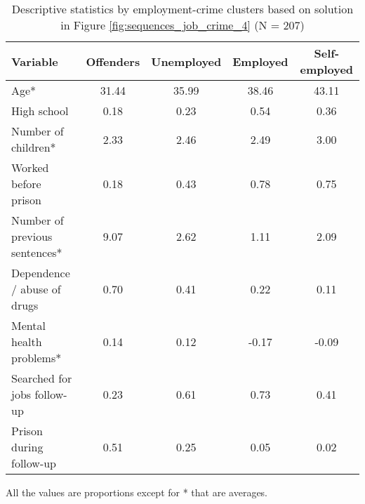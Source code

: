 \begin{table}[htp]
\footnotesize
\setlength{\tabcolsep}{10pt}
\renewcommand{\arraystretch}{1.3}
\begin{threeparttable}
\centering
\caption{Descriptive statistics by employment-crime clusters \newline based on solution in Figure \ref{fig:sequences_job_crime_4} (N = 207)} 
\label{tab:descriptives_job_crime_4}
\begin{tabular}{lcccc}
  \hline
Variable & Offenders & Unemployed & Employed & Self-employed \\ 
  \hline
Age* & 31.44 & 35.99 & 38.46 & 43.11 \\ 
  High school & 0.18 & 0.23 & 0.54 & 0.36 \\ 
  Number of children* & 2.33 & 2.46 & 2.49 & 3.00 \\ 
  Worked before prison & 0.18 & 0.43 & 0.78 & 0.75 \\ 
  Number of previous sentences* & 9.07 & 2.62 & 1.11 & 2.09 \\ 
  Dependence / abuse of drugs & 0.70 & 0.41 & 0.22 & 0.11 \\ 
  Mental health problems* & 0.14 & 0.12 & -0.17 & -0.09 \\ 
  Searched for jobs follow-up & 0.23 & 0.61 & 0.73 & 0.41 \\ 
  Prison during follow-up & 0.51 & 0.25 & 0.05 & 0.02 \\ 
   \hline
\end{tabular}
\begin{tablenotes}
\scriptsize
\item All the values are proportions except for * that are averages.
\end{tablenotes}
\end{threeparttable}
\end{table}
